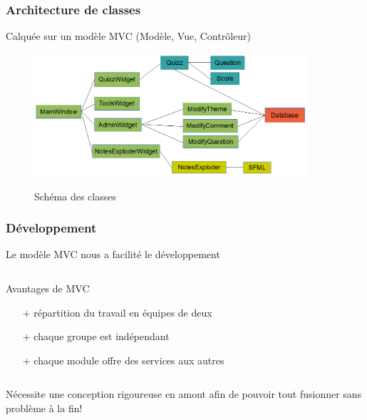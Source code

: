 \begin{frame}
	\frametitle{Architecture de classes}
	Calquée sur un modèle MVC (Modèle, Vue, Contrôleur)
	
	\begin{figure}[!h]
		\centering
			\includegraphics[width = 0.9\textwidth]{conception/classes.png}
		\label{Schéma des classes} 
		\caption{Schéma des classes}
	\end{figure}
\end{frame}

\begin{frame}
	\frametitle{Développement}
	Le modèle MVC nous a facilité le développement
		
	\begin{columns}[t]
		\begin{column}{10cm}
			\begin{exampleblock}{Avantages de MVC}
				\begin{itemize}
					\item[+] répartition du travail en équipes de deux
					\item[+] chaque groupe est indépendant
					\item[+] chaque module offre des services aux autres
				\end{itemize}
			\end{exampleblock} 
		\end{column}
	\end{columns}
	
	\bigskip
	
	Nécessite une conception rigoureuse en amont afin de pouvoir tout fusionner
	sans problème à la fin!
\end{frame}

